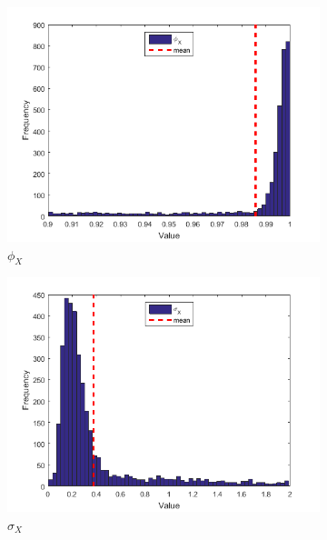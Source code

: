 \documentclass[11pt,a4,twosided,singlespacing,titlepagenumber=on]{scrreprt}
\numberwithin{equation}{chapter} %
\theoremstyle{remark}
\begin{document}
\begin{figure}[H]
    \centering
    \begin{subfigure}[t]{0.32\textwidth}
        \centering
        \includegraphics[width=1\textwidth]{res/params/5114_5845/1}
        \caption{$\phi_X$}
    \end{subfigure}
    \begin{subfigure}[t]{0.32\textwidth}
        \centering
        \includegraphics[width=1\textwidth]{res/params/5114_5845/2}
        \caption{$\sigma_X$}
    \end{subfigure}
    \begin{subfigure}[t]{0.32\textwidth}
        \centering

\end{subfigure}
\end{figure}
\end{document}
